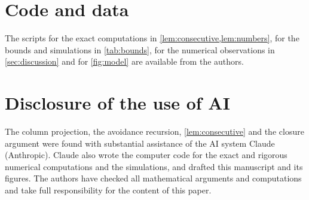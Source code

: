 \documentclass[11pt,letterpaper]{article}
\begin{document}
\section*{Code and data}
The scripts for the exact computations in \cref{lem:consecutive,lem:numbers}, for the bounds and simulations in \cref{tab:bounds}, for the numerical observations in \cref{sec:discussion} and for \cref{fig:model} are available from the authors.

\section*{Disclosure of the use of AI}
The column projection, the avoidance recursion, \cref{lem:consecutive} and the closure argument were found with substantial assistance of the AI system Claude (Anthropic). Claude also wrote the computer code for the exact and rigorous numerical computations and the simulations, and drafted this manuscript and its figures. The authors have checked all mathematical arguments and computations and take full responsibility for the content of this paper.



\end{document}
